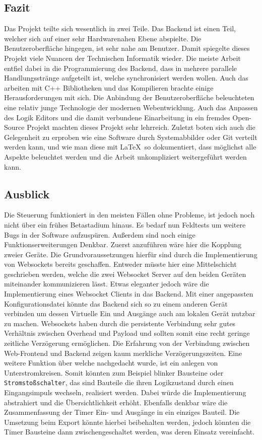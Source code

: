  \subsection{Fazit}
 Das Projekt teilte sich wesentlich in zwei Teile. Das Backend ist einen Teil, welcher sich auf einer sehr Hardwarenahen Ebene abspielte. Die Benutzeroberfläche hingegen, ist sehr nahe am Benutzer. Damit spiegelte dieses Projekt viele Nuancen der Technischen Informatik wieder. Die meiste Arbeit entfiel dabei in die Programmierung des Backend, dass in mehrere parallele Handlungsstränge aufgeteilt ist, welche synchronisiert werden wollen. Auch das arbeiten mit C++ Bibliotheken und das Kompilieren brachte einige Herausforderungen mit sich. Die Anbindung der Benutzeroberfläche beleuchteten eine relativ junge Technologie der modernen Webentwicklung. Auch das Anpassen des Logik Editors und die damit verbundene Einarbeitung in ein fremdes Open-Source Projekt machten dieses Projekt sehr lehrreich. Zuletzt boten sich auch die Gelegenheit zu erproben wie eine Software durch Systemabbilder oder Git verteilt werden kann, und wie man diese mit \LaTeX\ so dokumentiert, dass möglichst alle Aspekte beleuchtet werden und die  Arbeit unkompliziert weitergeführt werden kann.
 
 \subsection{Ausblick}
 Die Steuerung funktioniert in den meisten Fällen ohne Probleme, ist jedoch noch nicht über ein frühes Betastadium hinaus. Es bedarf nun Feldtests um weitere Bugs in der Software aufzuspüren. Außerdem sind noch einige Funktionserweiterungen Denkbar. Zuerst anzuführen wäre hier die Kopplung zweier Geräte. Die Grundvoraussetzungen hierfür sind durch die Implementierung  von Websockets bereits geschaffen. Entweder müsste hier eine Mittelschicht geschrieben werden, welche die zwei Websocket Server auf den beiden Geräten miteinander kommunizieren lässt. Etwas eleganter jedoch wäre die Implementierung eines Websocket Clients in das Backend. Mit einer angepassten Konfigurationsdatei könnte das Backend sich so zu einem anderen Gerät verbinden um dessen Virtuelle Ein und Ausgänge auch am lokalen Gerät nutzbar zu machen. Websockets haben durch die persistente Verbindung sehr gutes Verhältnis zwischen Overhead und Payload und sollten somit eine recht geringe zeitliche Verzögerung ermöglichen. Die Erfahrung von der Verbindung zwischen Web-Frontend und Backend zeigen kaum merkliche Verzögerungszeiten. Eine weitere Funktion über welche nachgedacht wurde, ist ein anlegen von Unterstromkreisen. Somit könnten zum Beispiel blinker Bausteine oder \texttt{Stromstoßschalter}, das sind Bauteile die ihren Logikzustand durch einen Eingangsimpuls wechseln, realisiert werden. Dabei würde die Implementierung abstrahiert und die Übersichtlichkeit erhöht. Ebenfalls denkbar wäre die Zusammenfassung der Timer Ein- und Ausgänge in ein einziges Bauteil. Die Umsetzung beim Export könnte hierbei beibehalten werden, jedoch könnten die Timer Bausteine dann zwischengeschaltet werden, was deren Einsatz vereinfacht. 
  

 
 
\clearpage